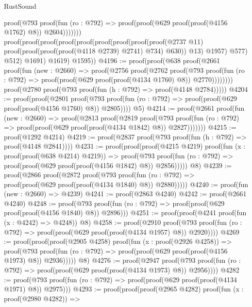 \begin{lexlean}{RustSound}
\begin{coremodule}
                proof(@793
                    proof(fun (ro : @792) =>
                      proof(proof(@629 proof(proof(@4156 @1762) @8)) @2604)))))))
      proof(proof(proof(proof(proof(proof(proof(proof(proof(@2737 @11)
                        proof(proof(proof(proof(@4118 @2739) @2741) @734) @630))
                      @13)
                    @1957)
                  @577)
                @512)
              @1691)
            @1619)
          @1595))
@4196 := proof(proof(@638
        proof(@2661
            proof(fun (new : @2660) =>
              proof(@2756
                  proof(@2762
                      proof(@793
                          proof(fun (ro : @792) =>
                            proof(proof(@629 proof(proof(@4134 @1760) @8)) @2770))))))))
      proof(@2780 proof(@793 proof(fun (h : @792) => proof(@4148 @2784)))))
@4204 := proof(proof(@2801
        proof(@793 proof(fun (ro : @792) => proof(proof(@629 proof(proof(@4156 @1760) @8)) @2805))))
      @5)
@4214 := proof(@2661
      proof(fun (new : @2660) =>
        proof(@2813
            proof(@2819
                proof(@793
                    proof(fun (ro : @792) =>
                      proof(proof(@629 proof(proof(@4134 @1842) @8)) @2827)))))))
@4215 := proof(@1292 @4214)
@4219 := proof(@2837 proof(@793 proof(fun (h : @792) => proof(@4148 @2841))))
@4231 := proof(proof(proof(@4215 @4219)
        proof(fun (x : proof(proof(@638 @4214) @4219)) =>
          proof(@793
              proof(fun (ro : @792) => proof(proof(@629 proof(proof(@4156 @1842) @8)) @2856)))))
      @8)
@4239 := proof(@2866
      proof(@2872
          proof(@793
              proof(fun (ro : @792) => proof(proof(@629 proof(proof(@4134 @1840) @8)) @2880)))))
@4240 := proof(fun (new : @2660) => @4239)
@4241 := proof(@2863 @4240)
@4242 := proof(@2661 @4240)
@4248 := proof(@793 proof(fun (ro : @792) => proof(proof(@629 proof(proof(@4156 @1840) @8)) @2896)))
@4251 := proof(proof(@4241 proof(fun (x : @4242) => @4248)) @8)
@4258 := proof(@2910
      proof(@793 proof(fun (ro : @792) => proof(proof(@629 proof(proof(@4134 @1957) @8)) @2920))))
@4269 := proof(proof(proof(@2905 @4258)
        proof(fun (x : proof(@2926 @4258)) =>
          proof(@793
              proof(fun (ro : @792) => proof(proof(@629 proof(proof(@4156 @1973) @8)) @2936)))))
      @8)
@4276 := proof(@2947
      proof(@793 proof(fun (ro : @792) => proof(proof(@629 proof(proof(@4134 @1973) @8)) @2956))))
@4282 := proof(@793 proof(fun (ro : @792) => proof(proof(@629 proof(proof(@4134 @1971) @8)) @2975)))
@4293 := proof(proof(proof(@2965 @4282)
        proof(fun (x : proof(@2980 @4282)) =>

\end{coremodule}
\end{lexlean}
